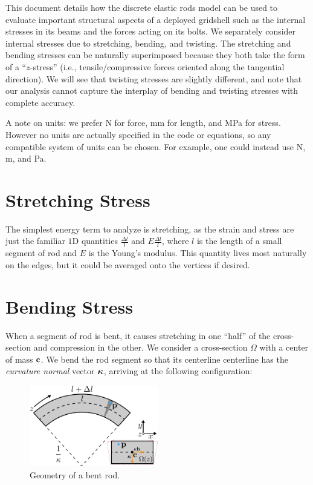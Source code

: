 \documentclass[10pt]{article}
\title{\documenttitle}
\author{Julian Panetta}
\def\mpa{\si{\mega\pascal} }
\def\mm{\si{\milli\meter} }
\begin{document}
\maketitle

This document details how the discrete elastic rods model can be used to
evaluate important structural aspects of a deployed gridshell such as the
internal stresses in its beams and the forces acting on its bolts.
We separately consider internal stresses due to stretching, bending, and twisting.
The stretching and bending stresses can be naturally superimposed because they
both take the form of a ``$z$-stress'' (i.e., tensile/compressive forces oriented
along the tangential direction). We will see that twisting stresses are slightly different,
and note that our analysis cannot capture the interplay of bending and twisting
stresses with complete accuracy.

A note on units: we prefer \si{\newton} for force, \mm for length, and
\mpa for stress. However no units are actually specified in the code or
equations, so any compatible system of units can be chosen. For example, one
could instead use \si{\newton}, \si{\meter}, and \si{\pascal}.

\section{Stretching Stress}
The simplest energy term to analyze is stretching, as the strain and stress are just
the familiar $1$D quantities $\frac{\Delta l}{l}$ and $E \frac{\Delta l}{l}$,
where $l$ is the length of a small segment of rod and $E$ is the Young's modulus.
This quantity lives most naturally on the edges, but it could be averaged onto
the vertices if desired.

\section{Bending Stress}
When a segment of rod is bent, it causes stretching in one ``half'' of the
cross-section and compression in the other. We consider a cross-section $\Omega$
with a center of mass ${\bf c}$. We bend the rod segment so that its centerline
centerline has the \emph{curvature normal} vector $\bm{\kappa}$, arriving at the
following configuration:
\begin{figure}[h]
    \centering
    \includegraphics[width=0.5\textwidth]{BendingFigure.pdf}
    \caption{Geometry of a bent rod.}
    \label{fig:bent_rod}
\end{figure}
\end{document}
